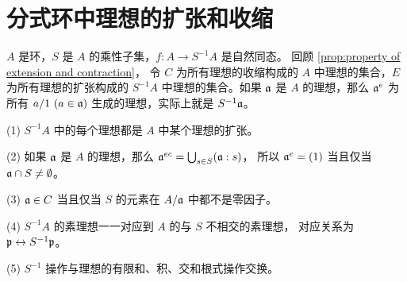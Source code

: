\section{分式环中理想的扩张和收缩}

$A$ 是环，$S$ 是 $A$ 的乘性子集，$f:A\to S^{-1}A$ 是自然同态。
回顾 \autoref{prop:property of extension and contraction}，
令 $C$ 为所有理想的收缩构成的 $A$ 中理想的集合，$E$ 为所有理想的扩张构成的 $S^{-1}A$
中理想的集合。如果 $\mathfrak{a}$ 是 $A$ 的理想，那么 $\mathfrak{a}^e$ 
为所有 $a/1\ (a\in\mathfrak{a})$ 生成的理想，实际上就是 $S^{-1}\mathfrak{a}$。

\begin{proposition}
  (1) $S^{-1}A$ 中的每个理想都是 $A$ 中某个理想的扩张。

  (2) 如果 $\mathfrak{a}$ 是 $A$ 的理想，那么 $\mathfrak{a}^{ec}=\bigcup_{s\in S}(\mathfrak{a}:s)$，
  所以 $\mathfrak{a}^e=(1)$ 当且仅当 $\mathfrak{a}\cap S\neq\emptyset$。

  (3) $\mathfrak{a}\in C$ 当且仅当 $S$ 的元素在 $A/\mathfrak{a}$ 中都不是零因子。

  (4) $S^{-1}A$ 的素理想一一对应到 $A$ 的与 $S$ 不相交的素理想，
  对应关系为 $\mathfrak{p}\leftrightarrow S^{-1}\mathfrak{p}$。

  (5) $S^{-1}$ 操作与理想的有限和、积、交和根式操作交换。
\end{proposition}
